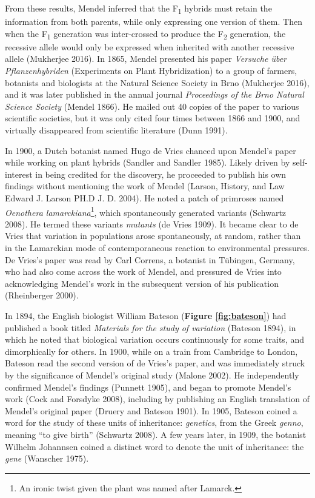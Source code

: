 \documentclass[
]{book}
\begin{document}
From these results, Mendel inferred that the F\textsubscript{1} hybrids must retain the information from both parents, while only expressing one version of them. Then when the F\textsubscript{1} generation was inter-crossed to produce the F\textsubscript{2} generation, the recessive allele would only be expressed when inherited with another recessive allele (Mukherjee 2016). In 1865, Mendel presented his paper \emph{Versuche über Pflanzenhybriden} (Experiments on Plant Hybridization) to a group of farmers, botanists and biologists at the Natural Science Society in Brno (Mukherjee 2016), and it was later published in the annual journal \emph{Proceedings of the Brno Natural Science Society} (Mendel 1866). He mailed out 40 copies of the paper to various scientific societies, but it was only cited four times between 1866 and 1900, and virtually disappeared from scientific literature (Dunn 1991).

In 1900, a Dutch botanist named Hugo de Vries chanced upon Mendel's paper while working on plant hybrids (Sandler and Sandler 1985). Likely driven by self-interest in being credited for the discovery, he proceeded to publish his own findings without mentioning the work of Mendel (Larson, History, and Law Edward J. Larson PH.D J. D. 2004). He noted a patch of primroses named \emph{Oenothera lamarckiana}\footnote{An ironic twist given the plant was named after Lamarck.}, which spontaneously generated variants (Schwartz 2008). He termed these variants \emph{mutants} (de Vries 1909). It became clear to de Vries that variation in populations arose spontaneously, at random, rather than in the Lamarckian mode of contemporaneous reaction to environmental pressures. De Vries's paper was read by Carl Correns, a botanist in Tübingen, Germany, who had also come across the work of Mendel, and pressured de Vries into acknowledging Mendel's work in the subsequent version of his publication (Rheinberger 2000).

In 1894, the English biologist William Bateson (\textbf{Figure \ref{fig:bateson}}) had published a book titled \emph{Materials for the study of variation} (Bateson 1894), in which he noted that biological variation occurs continuously for some traits, and dimorphically for others. In 1900, while on a train from Cambridge to London, Bateson read the second version of de Vries's paper, and was immediately struck by the significance of Mendel's original study (Malone 2002). He independently confirmed Mendel's findings (Punnett 1905), and began to promote Mendel's work (Cock and Forsdyke 2008), including by publishing an English translation of Mendel's original paper (Druery and Bateson 1901). In 1905, Bateson coined a word for the study of these units of inheritance: \emph{genetics}, from the Greek \emph{genno}, meaning ``to give birth'' (Schwartz 2008). A few years later, in 1909, the botanist Wilhelm Johannsen coined a distinct word to denote the unit of inheritance: the \emph{gene} (Wanscher 1975).
\end{document}
